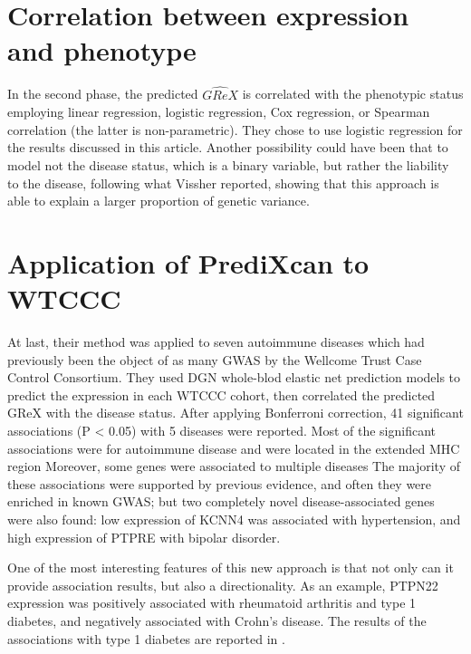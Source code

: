 \documentclass[../main.tex]{subfiles}
\begin{document}
\section{Correlation between expression and phenotype}

In the second phase, the predicted $\hat{GReX}$ is correlated with the 
phenotypic status employing linear regression, logistic regression, Cox 
regression, or Spearman correlation (the latter is non-parametric). They 
chose to use logistic regression for the results discussed in this 
article. Another possibility could have been that to model not the 
disease status, which is a binary variable, but rather the liability to 
the disease, following what Vissher\cite{Visscher2008} reported, showing 
that this approach is able to explain a larger proportion of genetic 
variance.

\section{Application of PrediXcan to WTCCC}

At last, their method was applied to seven autoimmune diseases which had 
previously been the object of as many GWAS by the Wellcome Trust Case 
Control Consortium\cite{WTCC2007}. They used DGN whole-blod elastic net 
prediction models to predict the expression in each WTCCC cohort, then 
correlated the predicted GReX with the disease status. After applying 
Bonferroni correction, 41 significant associations (P < 0.05) with 5 
diseases were reported. Most of the significant associations were for 
autoimmune disease and were located in the extended MHC 
region Moreover, some genes were 
associated to multiple diseases The majority of these 
associations were supported by previous evidence, and often they were 
enriched in known GWAS; but two completely novel disease-associated 
genes were also found: low expression of KCNN4 was associated with 
hypertension, and high expression of PTPRE with bipolar disorder.

One of the most interesting features of this new approach is that not 
only can it provide association results, but also a directionality. As 
an example, PTPN22 expression was positively associated with rheumatoid 
arthritis and type 1 diabetes, and negatively associated with Crohn's 
disease. The results of the associations with type 1 diabetes are 
reported in .
\end{document}
